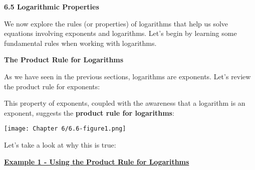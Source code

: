 \documentclass[12pt]{book}
\begin{document}
\begin{comment}
Name: \underline{\hspace{100mm}}
\vspace{20mm}
  \centerline{\Large \textbf{Chapter 2: Equations and Inequalities} } 

{\large
\begin{center}
\begin{varwidth}{\textwidth}
\begin{enumerate}[2.1]
    \item The Regular Coordinate System and Graphs
    \item Linear Equations in One Variable
    \item Models and  Applications (Skipping)
    \item Complex Numbers
    \item Quadratic Equations
    \item Other Types of Equations
    \item Linear Inequalities and Absolute Value Inequalities
\end{enumerate}
\end{varwidth}
\end{center}

}
\newpage  
\end{comment}

{\Large \textbf{6.5 Logarithmic Properties}}

We now explore the rules (or properties) of logarithms that help us solve equations involving exponents and logarithms. Let’s begin by learning some fundamental rules when working with logarithms.

\vspace{3mm}
\textbf{{\large The Product Rule for Logarithms}}

As we have seen in the previous sections, logarithms are exponents. Let's review the product rule for exponents:


\vspace{10mm}

This property of exponents, coupled with the awareness that a logarithm is an exponent, suggests the \textbf{product rule for logarithms}:
\vspace{1mm}

\centerline{\texttt{[image: Chapter 6/6.6-figure1.png]}}
Let's take a look at why this is true:

\vspace{50mm}

\underline{\textbf{Example 1 - Using the Product Rule for Logarithms}}
\end{document}
